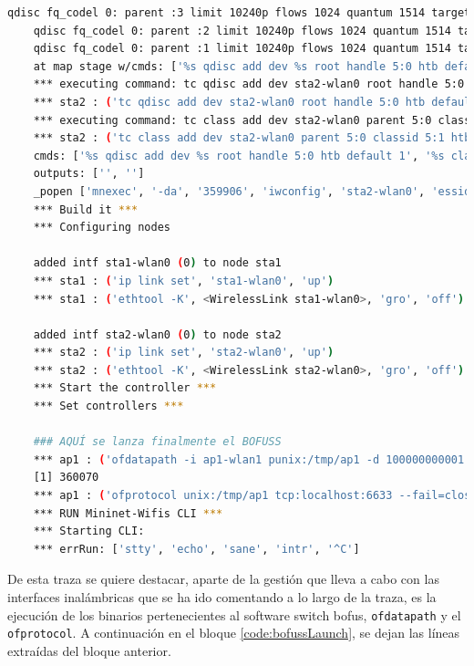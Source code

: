 \begin{lstlisting}[language= bash, style=Consola, caption={Traza de la puesta en marcha del escenario básico},label=code:trazatopobasic]
    qdisc fq_codel 0: parent :3 limit 10240p flows 1024 quantum 1514 target 5ms interval 100ms memory_limit 32Mb ecn drop_batch 64 
    qdisc fq_codel 0: parent :2 limit 10240p flows 1024 quantum 1514 target 5ms interval 100ms memory_limit 32Mb ecn drop_batch 64 
    qdisc fq_codel 0: parent :1 limit 10240p flows 1024 quantum 1514 target 5ms interval 100ms memory_limit 32Mb ecn drop_batch 64 
    at map stage w/cmds: ['%s qdisc add dev %s root handle 5:0 htb default 1', '%s class add dev %s parent 5:0 classid 5:1 htb rate 11.000000Mbit burst 15k']
    *** executing command: tc qdisc add dev sta2-wlan0 root handle 5:0 htb default 1
    *** sta2 : ('tc qdisc add dev sta2-wlan0 root handle 5:0 htb default 1',)
    *** executing command: tc class add dev sta2-wlan0 parent 5:0 classid 5:1 htb rate 11.000000Mbit burst 15k
    *** sta2 : ('tc class add dev sta2-wlan0 parent 5:0 classid 5:1 htb rate 11.000000Mbit burst 15k',)
    cmds: ['%s qdisc add dev %s root handle 5:0 htb default 1', '%s class add dev %s parent 5:0 classid 5:1 htb rate 11.000000Mbit burst 15k'] 
    outputs: ['', ''] 
    _popen ['mnexec', '-da', '359906', 'iwconfig', 'sta2-wlan0', 'essid', 'new-ssid', 'ap', '00:00:00:00:00:01'] 360065
    *** Build it ***
    *** Configuring nodes

    added intf sta1-wlan0 (0) to node sta1
    *** sta1 : ('ip link set', 'sta1-wlan0', 'up')
    *** sta1 : ('ethtool -K', <WirelessLink sta1-wlan0>, 'gro', 'off')

    added intf sta2-wlan0 (0) to node sta2
    *** sta2 : ('ip link set', 'sta2-wlan0', 'up')
    *** sta2 : ('ethtool -K', <WirelessLink sta2-wlan0>, 'gro', 'off')
    *** Start the controller ***
    *** Set controllers ***

    ### AQUÍ se lanza finalmente el BOFUSS
    *** ap1 : ('ofdatapath -i ap1-wlan1 punix:/tmp/ap1 -d 100000000001 --no-slicing 1> /tmp/ap1-ofd.log 2> /tmp/ap1-ofd.log &',)
    [1] 360070
    *** ap1 : ('ofprotocol unix:/tmp/ap1 tcp:localhost:6633 --fail=closed  --listen=punix:/tmp/ap1.listen 1> /tmp/ap1-ofp.log 2>/tmp/ap1-ofp.log &',)
    *** RUN Mininet-Wifis CLI ***
    *** Starting CLI:
    *** errRun: ['stty', 'echo', 'sane', 'intr', '^C'] 
\end{lstlisting}
\vspace{0.5cm}

De esta traza se quiere destacar, aparte de la gestión que lleva a cabo con las interfaces inalámbricas que se ha ido comentando a lo largo de la traza, es la ejecución de los binarios pertenecientes al software switch \gls{bofus}, \texttt{ofdatapath} y el \texttt{ofprotocol}. A continuación en el bloque \ref{code:bofussLaunch}, se dejan las líneas extraídas del bloque anterior.

